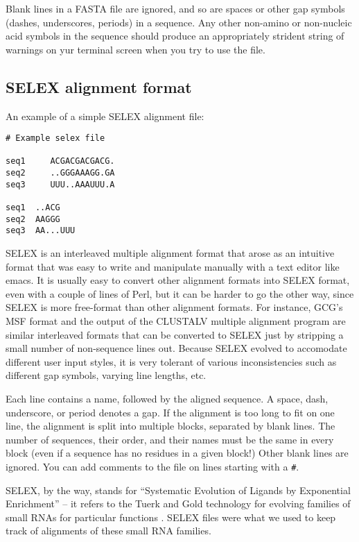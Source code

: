 Blank lines in a FASTA file are ignored, and so are spaces or other
gap symbols (dashes, underscores, periods) in a sequence. Any other
non-amino or non-nucleic acid symbols in the sequence should produce
an appropriately strident string of warnings on yur terminal screen
when you try to use the file.

\subsection{SELEX alignment format}

An example of a simple SELEX alignment file:

\begin{verbatim}
# Example selex file

seq1     ACGACGACGACG.
seq2     ..GGGAAAGG.GA
seq3     UUU..AAAUUU.A

seq1  ..ACG
seq2  AAGGG
seq3  AA...UUU
\end{verbatim}

SELEX is an interleaved multiple alignment format that arose as an
intuitive format that was easy to write and manipulate manually with a
text editor like emacs. It is usually easy to convert other alignment
formats into SELEX format, even with a couple of lines of Perl, but it
can be harder to go the other way, since SELEX is more free-format
than other alignment formats. For instance, GCG's MSF format and the
output of the CLUSTALV multiple alignment program are similar
interleaved formats that can be converted to SELEX just by stripping a
small number of non-sequence lines out. Because SELEX evolved to
accomodate different user input styles, it is very tolerant of various
inconsistencies such as different gap symbols, varying line lengths,
etc.

Each line contains a name, followed by the aligned sequence. A space,
dash, underscore, or period denotes a gap. If the alignment is too
long to fit on one line, the alignment is split into multiple blocks,
separated by blank lines. The number of sequences, their order, and
their names must be the same in every block (even if a sequence has no
residues in a given block!) Other blank lines are ignored. You can add
comments to the file on lines starting with a \verb+#+.

SELEX, by the way, stands for ``Systematic Evolution of Ligands by
Exponential Enrichment'' -- it refers to the Tuerk and Gold technology
for evolving families of small RNAs for particular functions
\cite{Tuerk90b}. SELEX files were what we used to keep track of
alignments of these small RNA families.

